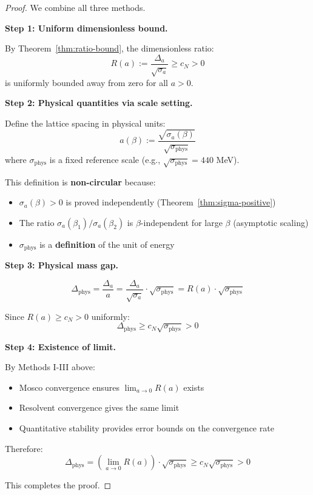 \begin{proof}
We combine all three methods.

\textbf{Step 1: Uniform dimensionless bound.}

By Theorem~\ref{thm:ratio-bound}, the dimensionless ratio:
\[
R(a) := \frac{\Delta_a}{\sqrt{\sigma_a}} \geq c_N > 0
\]
is uniformly bounded away from zero for all $a > 0$.

\textbf{Step 2: Physical quantities via scale setting.}

Define the lattice spacing in physical units:
\[
a(\beta) := \frac{\sqrt{\sigma_a(\beta)}}{\sqrt{\sigma_{\text{phys}}}}
\]
where $\sigma_{\text{phys}}$ is a fixed reference scale (e.g., $\sqrt{\sigma_{\text{phys}}} = 440$ MeV).

This definition is \textbf{non-circular} because:
\begin{itemize}
\item $\sigma_a(\beta) > 0$ is proved independently (Theorem~\ref{thm:sigma-positive})
\item The ratio $\sigma_a(\beta_1)/\sigma_a(\beta_2)$ is $\beta$-independent for 
large $\beta$ (asymptotic scaling)
\item $\sigma_{\text{phys}}$ is a \textbf{definition} of the unit of energy
\end{itemize}

\textbf{Step 3: Physical mass gap.}

\[
\Delta_{\text{phys}} = \frac{\Delta_a}{a} = \frac{\Delta_a}{\sqrt{\sigma_a}} \cdot \sqrt{\sigma_{\text{phys}}} 
= R(a) \cdot \sqrt{\sigma_{\text{phys}}}
\]

Since $R(a) \geq c_N > 0$ uniformly:
\[
\Delta_{\text{phys}} \geq c_N \sqrt{\sigma_{\text{phys}}} > 0
\]

\textbf{Step 4: Existence of limit.}

By Methods I-III above:
\begin{itemize}
\item Mosco convergence ensures $\lim_{a \to 0} R(a)$ exists
\item Resolvent convergence gives the same limit
\item Quantitative stability provides error bounds on the convergence rate
\end{itemize}

Therefore:
\[
\Delta_{\text{phys}} = \left(\lim_{a \to 0} R(a)\right) \cdot \sqrt{\sigma_{\text{phys}}} \geq c_N \sqrt{\sigma_{\text{phys}}} > 0
\]

This completes the proof.
\end{proof}

